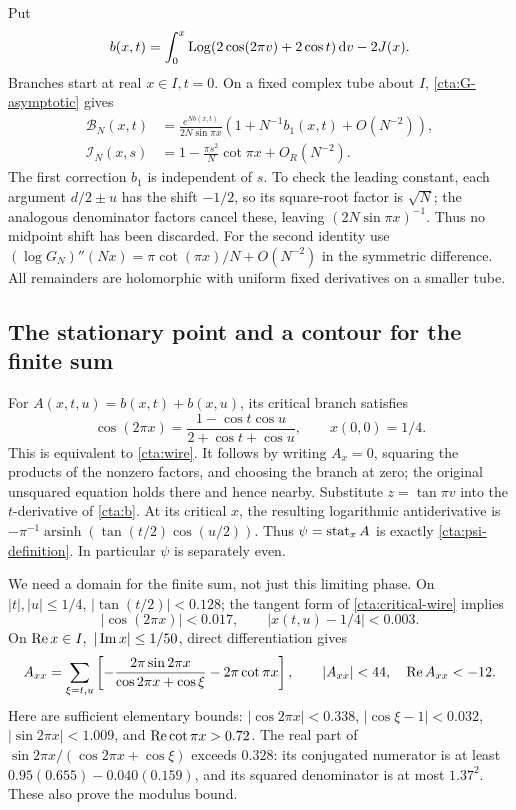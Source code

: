 Put
\begin{equation}\label{cta:b}
 b(x,t)=\int_0^x\operatorname{Log}(2\cos(2\pi v)+2\cos t)\,\mathrm d v-2J(x).
\end{equation}
Branches start at real \(x\in I,t=0\).
On a fixed complex tube about \(I\), \eqref{cta:G-asymptotic} gives
\begin{equation}\label{cta:bulk}
 \begin{split}
 \mathcal B_N(x,t)
   &=\frac{e^{Nb(x,t)}}{2N\sin\pi x}
          (1+N^{-1}b_1(x,t)+O(N^{-2})),\\
 \mathcal I_N(x,s)
   &=1-\frac{\pi s^2}{N}\cot\pi x+O_R(N^{-2}).
 \end{split}
\end{equation}
The first correction \(b_1\) is independent of \(s\).
To check the leading constant, each argument \(d/2\pm u\)
has the shift \(-1/2\), so its square-root factor is \(\sqrt N\);
the analogous denominator factors cancel these, leaving
\((2N\sin\pi x)^{-1}\). Thus no midpoint shift has been discarded.
For the second identity use
\((\log G_N)''(Nx)=\pi\cot(\pi x)/N+O(N^{-2})\)
in the symmetric difference. All remainders are holomorphic
with uniform fixed derivatives on a smaller tube.

\subsection{The stationary point and a contour for the finite sum}
For \(A(x,t,u)=b(x,t)+b(x,u)\), its critical branch satisfies
\begin{equation}\label{cta:critical-wire}
 \cos(2\pi x)=\frac{1-\cos t\cos u}{2+\cos t+\cos u},
 \qquad x(0,0)=1/4.
\end{equation}
This is equivalent to \eqref{cta:wire}. It follows by writing
\(A_x=0\), squaring the products of the nonzero factors, and
choosing the branch at zero; the original unsquared equation
holds there and hence nearby.
Substitute \(z=\tan\pi v\) into the \(t\)-derivative of
\eqref{cta:b}. At its critical \(x\), the resulting logarithmic
antiderivative is
\(-\pi^{-1}\operatorname{arsinh}(\tan(t/2)\cos(u/2))\).
Thus \(\psi=\operatorname{stat}_x A\) is exactly \eqref{cta:psi-definition}.
In particular \(\psi\) is separately even.

We need a domain for the finite sum, not just this limiting phase.
On \(|t|,|u|\le1/4\), \(|\tan(t/2)|<0.128\); the tangent form
of \eqref{cta:critical-wire} implies
\[
 |\cos(2\pi x)|<0.017,\qquad |x(t,u)-1/4|<0.003.
\]
On \(\operatorname{Re} x\in I,\ |\operatorname{Im} x|\le1/50\), direct differentiation gives
\begin{equation}\label{cta:Axx}
 A_{xx}=\sum_{\xi=t,u}
 \left[-\frac{2\pi\sin2\pi x}{\cos2\pi x+\cos\xi}
                         -2\pi\cot\pi x\right],
 \qquad |A_{xx}|<44,\quad \operatorname{Re} A_{xx}<-12.
\end{equation}
Here are sufficient elementary bounds: \(|\cos2\pi x|<0.338\),
\(|\cos\xi-1|<0.032\), \(|\sin2\pi x|<1.009\), and
\(\operatorname{Re}\cot\pi x>0.72\).
The real part of
\(\sin2\pi x/(\cos2\pi x+\cos\xi)\) exceeds \(0.328\):
its conjugated numerator is at least
\(0.95(0.655)-0.040(0.159)\), and its squared denominator is
at most \(1.37^2\). These also prove the modulus bound.

